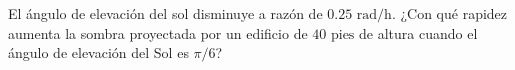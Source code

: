 \item El ángulo de elevación del sol disminuye a razón de $0.25 \text{ rad/h}$. ¿Con qué rapidez aumenta la sombra proyectada por un edificio de $40 \text{ pies}$ de altura cuando el ángulo de elevación del Sol es $\pi/6$?

